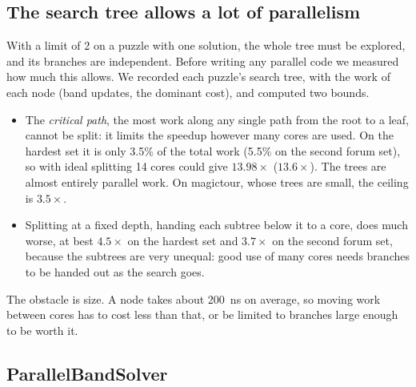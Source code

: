 \documentclass[11pt]{article}
\theoremstyle{definition}
\theoremstyle{plain}
\begin{document}
\subsection{The search tree allows a lot of parallelism}

With a limit of 2 on a puzzle with one solution, the whole tree must be explored, and its branches are independent.
Before writing any parallel code we measured how much this allows. We recorded each puzzle's search tree, with the work
of each node (band updates, the dominant cost), and computed two bounds.
\begin{itemize}
\item The \emph{critical path}, the most work along any single path from the root to a leaf, cannot be split: it limits
  the speedup however many cores are used. On the hardest set it is only 3.5\% of the total work (5.5\% on the second
  forum set), so with ideal splitting 14 cores could give $13.98\times$ ($13.6\times$). The trees are almost entirely
  parallel work. On magictour, whose trees are small, the ceiling is $3.5\times$.
\item Splitting at a fixed depth, handing each subtree below it to a core, does much worse, at best $4.5\times$ on the
  hardest set and $3.7\times$ on the second forum set, because the subtrees are very unequal: good use of many cores
  needs branches to be handed out as the search goes.
\end{itemize}

The obstacle is size. A node takes about \SI{200}{\nano\second} on average, so moving work between cores has to cost less than that,
or be limited to branches large enough to be worth it.

\subsection{ParallelBandSolver}
\end{document}
